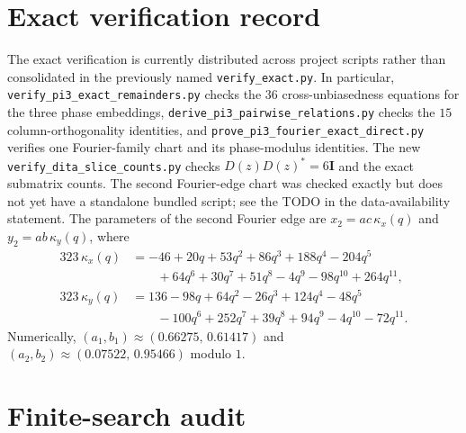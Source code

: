 \documentclass[11pt]{article}
\numberwithin{equation}{section}
\theoremstyle{plain}
\theoremstyle{definition}
\theoremstyle{remark}
\newcommand{\I}{\mathbf{I}}
\begin{document}
\section{Exact verification record}\label{app:exact}

The exact verification is currently distributed across project scripts rather than consolidated in the previously named \texttt{verify\_exact.py}. In particular, \texttt{verify\_pi3\_exact\_remainders.py} checks the $36$ cross-unbiasedness equations for the three phase embeddings, \texttt{derive\_pi3\_pairwise\_relations.py} checks the $15$ column-orthogonality identities, and \texttt{prove\_pi3\_fourier\_exact\_direct.py} verifies one Fourier-family chart and its phase-modulus identities. The new \texttt{verify\_dita\_slice\_counts.py} checks $D(z)D(z)^*=6\I$ and the exact submatrix counts. The second Fourier-edge chart was checked exactly but does not yet have a standalone bundled script; see the TODO in the data-availability statement.
The parameters of the second Fourier edge are $x_2=ac\,\kappa_x(q)$ and $y_2=ab\,\kappa_y(q)$, where
\begin{align*}
323\,\kappa_x(q)&=-46+20q+53q^2+86q^3+188q^4-204q^5\\&\qquad+64q^6+30q^7+51q^8-4q^9-98q^{10}+264q^{11},\\
323\,\kappa_y(q)&=136-98q+64q^2-26q^3+124q^4-48q^5\\&\qquad-100q^6+252q^7+39q^8+94q^9-4q^{10}-72q^{11}.
\end{align*}
Numerically, $(a_1,b_1)\approx(0.66275,\,0.61417)$ and $(a_2,b_2)\approx(0.07522,\,0.95466)$ modulo $1$.

\section{Finite-search audit}\label{app:audit}
\end{document}
